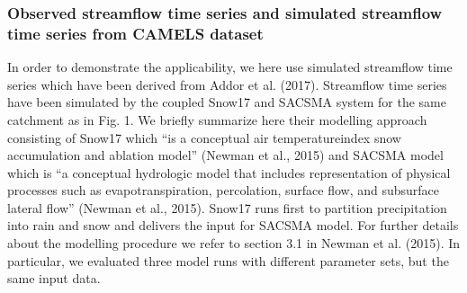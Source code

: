 \documentclass[letterpaper,10pt,english]{sphinxmanual}
\begin{document}
\subsubsection{Observed streamflow time series and simulated streamflow time series from CAMELS dataset}
\label{\detokenize{tutorials/02_real_case_application:Observed-streamflow-time-series-and-simulated-streamflow-time-series-from-CAMELS-dataset}}
In order to demonstrate the applicability, we here use simulated streamflow time series which have been derived from Addor et al. (2017). Streamflow time series have been simulated by the coupled Snow\sphinxhyphen{}17 and SAC\sphinxhyphen{}SMA system for the same catchment as in Fig. 1. We briefly summarize here their modelling approach consisting of Snow\sphinxhyphen{}17 which “is a conceptual air\sphinxhyphen{} temperature\sphinxhyphen{}index snow accumulation and ablation model” (Newman et al., 2015) and SAC\sphinxhyphen{}SMA model which is “a conceptual hydrologic model
that includes representation of physical processes such as evapotranspiration, percolation, surface flow, and subsurface lateral flow” (Newman et al., 2015). Snow\sphinxhyphen{}17 runs first to partition precipitation into rain and snow and delivers the input for SAC\sphinxhyphen{}SMA model. For further details about the modelling procedure we refer to section 3.1 in Newman et al. (2015). In particular, we evaluated three model runs with different parameter sets, but the same input data.

{
\begin{sphinxVerbatim}[commandchars=\\\{\}]
\llap{\color{nbsphinxin}[4]:\,\hspace{\fboxrule}\hspace{\fboxsep}}  
  
  

  
  
  
\end{sphinxVerbatim}
}
\end{document}
